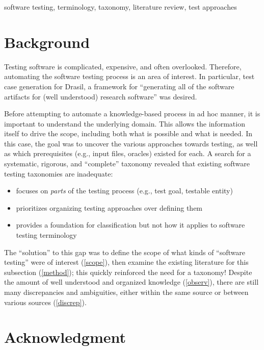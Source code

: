 \documentclass[conference]{IEEEtran}
\begin{document}
\begin{IEEEkeywords}
    software testing, terminology, taxonomy, literature review, test approaches
\end{IEEEkeywords}

\section{Background}


Testing software is complicated, expensive, and often overlooked. Therefore,
automating the software testing process is an area of interest. In particular,
test case generation for Drasil, a framework for ``generating all of the
software artifacts for (well understood) research software'' \cite{Drasil} was
desired.

Before attempting to automate a knowledge-based process in ad hoc manner, it is
important to understand the underlying domain. This allows the information
itself to drive the scope, including both what is possible and what is needed.
In this case, the goal was to uncover the various approaches towards testing,
as well as which prerequisites (e.g., input files, oracles) existed for each.
A search for a systematic, rigorous, and ``complete'' taxonomy revealed that
existing software testing taxonomies are inadequate:

\begin{itemize}
    \item \cite{TebesEtAl2020a} focuses on \emph{parts} of the
          testing process (e.g., test goal, testable entity)
    \item \cite{SouzaEtAl2017} prioritizes organizing testing
          approaches over defining them
    \item \cite{UnterkalmsteinerEtAl2014} provides a foundation for
          classification but not how it applies to software testing terminology
\end{itemize}

The ``solution'' to this gap was to define the scope of what kinds of
``software testing'' were of interest (\ref{scope}), then examine the existing
literature for this subsection (\ref{method}); this
quickly reinforced the need for a taxonomy! Despite the amount of
well understood and organized knowledge (\ref{observ}), there are still many
discrepancies and ambiguities, either within the same source or between various
sources (\ref{discrep}).






\section*{Acknowledgment}


\newpage



\end{document}
